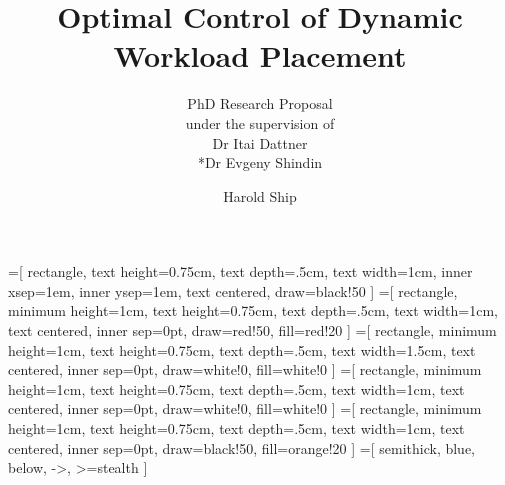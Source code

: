 \documentclass[pdf]{beamer}
\title{Optimal Control of Dynamic Workload Placement}
\subtitle{PhD Research Proposal \\ under the supervision of \\ Dr Itai Dattner \\ *Dr Evgeny Shindin}
\author{Harold Ship}
\institute{University of Haifa}
\theoremstyle{definition}
\begin{document}
=[%
rectangle,
text height=0.75cm,
text depth=.5cm,
text width=1cm,
inner xsep=1em,
inner ysep=1em,
text centered,
draw=black!50
]
=[%
rectangle,
minimum height=1cm,
text height=0.75cm,
text depth=.5cm,
text width=1cm,
text centered,
inner sep=0pt,
draw=red!50,
fill=red!20
]
=[%
rectangle,
minimum height=1cm,
text height=0.75cm,
text depth=.5cm,
text width=1.5cm,
text centered,
inner sep=0pt,
draw=white!0,
fill=white!0
]
=[%
rectangle,
minimum height=1cm,
text height=0.75cm,
text depth=.5cm,
text width=1cm,
text centered,
inner sep=0pt,
draw=white!0,
fill=white!0
]
=[%
rectangle,
minimum height=1cm,
text height=0.75cm,
text depth=.5cm,
text width=1cm,
text centered,
inner sep=0pt,
draw=black!50,
fill=orange!20
]
=[%
semithick,
blue,
below,
->,
>=stealth
]



\begin{frame}
    \titlepage
\end{frame}
\end{document}
